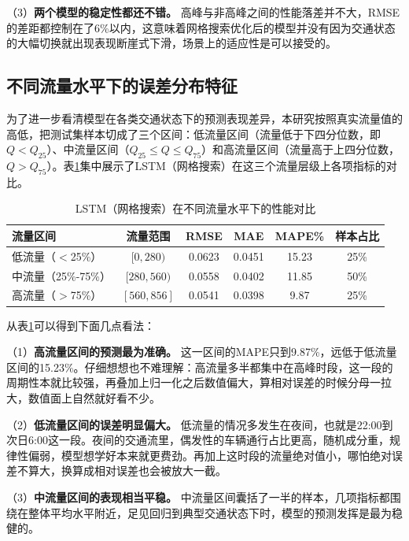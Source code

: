 \documentclass[12pt,a4paper,oneside]{ctexbook}
\begin{document}
	（3）\textbf{两个模型的稳定性都还不错。} 高峰与非高峰之间的性能落差并不大，RMSE的差距都控制在了6\%以内，这意味着网格搜索优化后的模型并没有因为交通状态的大幅切换就出现表现断崖式下滑，场景上的适应性是可以接受的。
	
	\subsection{不同流量水平下的误差分布特征}
	
	为了进一步看清模型在各类交通状态下的预测表现差异，本研究按照真实流量值的高低，把测试集样本切成了三个区间：低流量区间（流量低于下四分位数，即$Q < Q_{25}$）、中流量区间（$Q_{25} \leq Q \leq Q_{75}$）和高流量区间（流量高于上四分位数，$Q > Q_{75}$）。表\ref{tab:flow_level}集中展示了LSTM（网格搜索）在这三个流量层级上各项指标的对比。
	
	\begin{table}[H]
		\centering
		\caption{LSTM（网格搜索）在不同流量水平下的性能对比}
		\label{tab:flow_level}
		\begin{tabular}{lccccc}
			\toprule
			流量区间 & 流量范围 & RMSE & MAE & MAPE\% & 样本占比 \\
			\midrule
			低流量（$<$25\%） & $[0, 280)$   & 0.0623 & 0.0451 & 15.23 & 25\% \\
			中流量（25\%-75\%） & $[280, 560)$ & 0.0558 & 0.0402 & 11.85 & 50\% \\
			高流量（$>$75\%） & $[560, 856]$ & 0.0541 & 0.0398 & 9.87  & 25\% \\
			\bottomrule
		\end{tabular}
	\end{table}
	
	从表\ref{tab:flow_level}可以得到下面几点看法：
	
	（1）\textbf{高流量区间的预测最为准确。} 这一区间的MAPE只到9.87\%，远低于低流量区间的15.23\%。仔细想想也不难理解：高流量多半都集中在高峰时段，这一段的周期性本就比较强，再叠加上归一化之后数值偏大，算相对误差的时候分母一拉大，数值面上自然就好看不少。
	
	（2）\textbf{低流量区间的误差明显偏大。} 低流量的情况多发生在夜间，也就是22:00到次日6:00这一段。夜间的交通流里，偶发性的车辆通行占比更高，随机成分重，规律性偏弱，模型想学好本来就更费劲。再加上这时段的流量绝对值小，哪怕绝对误差不算大，换算成相对误差也会被放大一截。
	
	（3）\textbf{中流量区间的表现相当平稳。} 中流量区间囊括了一半的样本，几项指标都围绕在整体平均水平附近，足见回归到典型交通状态下时，模型的预测发挥是最为稳健的。
	
\end{document}
